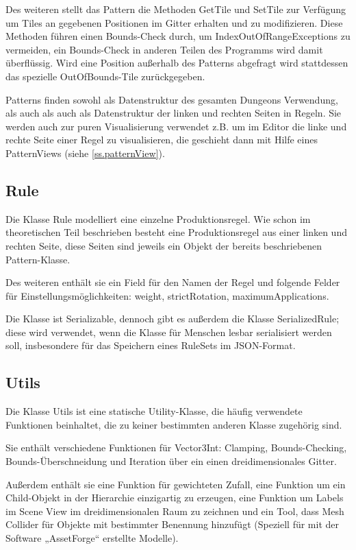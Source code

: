 Des weiteren stellt das Pattern die Methoden GetTile und SetTile zur Verfügung um Tiles an gegebenen Positionen im Gitter erhalten und zu modifizieren. Diese Methoden führen einen Bounds-Check durch, um IndexOutOfRangeExceptions zu vermeiden, ein Bounds-Check in anderen Teilen des Programms wird damit überflüssig. Wird eine Position außerhalb des Patterns abgefragt wird stattdessen das spezielle OutOfBounds-Tile zurückgegeben.

Patterns finden sowohl als Datenstruktur des gesamten Dungeons Verwendung, als auch als auch als Datenstruktur der linken und rechten Seiten in Regeln. Sie werden auch zur puren Visualisierung verwendet z.B. um im Editor die linke und rechte Seite einer Regel zu visualisieren, die geschieht dann mit Hilfe eines PatternViews (siehe \ref{ss.patternView}).

\subsection{Rule}

Die Klasse Rule modelliert eine einzelne Produktionsregel. Wie schon im theoretischen Teil beschrieben besteht eine Produktionsregel aus einer linken und rechten Seite, diese Seiten sind jeweils ein Objekt der bereits beschriebenen Pattern-Klasse.

Des weiteren enthält sie ein Field für den Namen der Regel und folgende Felder für Einstellungsmöglichkeiten: weight, strictRotation, maximumApplications.

Die Klasse ist Serializable, dennoch gibt es außerdem die Klasse SerializedRule; diese wird verwendet, wenn die Klasse für Menschen lesbar serialisiert werden soll, insbesondere für das Speichern eines RuleSets im JSON-Format. 

\subsection{Utils}

Die Klasse Utils ist eine statische Utility-Klasse, die häufig verwendete Funktionen beinhaltet, die zu keiner bestimmten anderen Klasse zugehörig sind.

Sie enthält verschiedene Funktionen für Vector3Int\cite[Seite: Vector3Int]{unitySciptingReference}: Clamping, Bounds-Checking, Bounds-Überschneidung und Iteration über ein einen dreidimensionales Gitter.

Außerdem enthält sie eine Funktion für gewichteten Zufall, eine Funktion um ein Child-Objekt in der Hierarchie einzigartig zu erzeugen, eine Funktion um Labels im Scene View im dreidimensionalen Raum zu zeichnen und ein Tool, dass Mesh Collider für Objekte mit bestimmter Benennung hinzufügt (Speziell für mit der Software „AssetForge“ erstellte Modelle).


